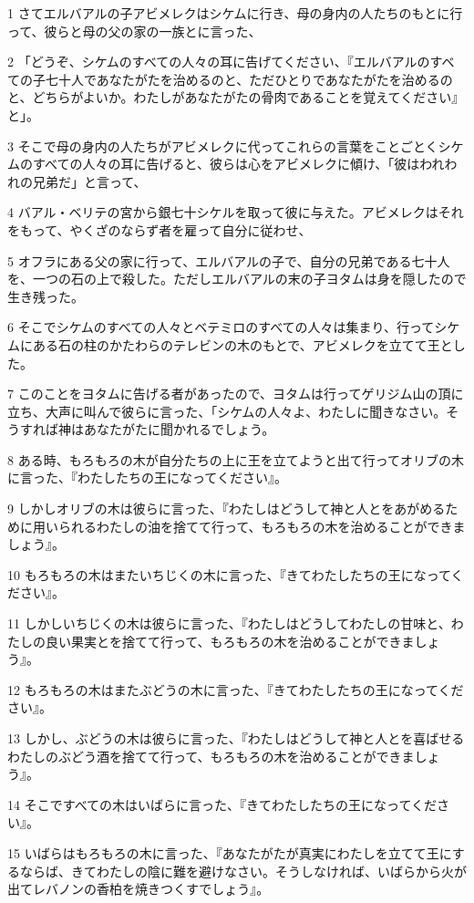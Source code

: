 \par 1 さてエルバアルの子アビメレクはシケムに行き、母の身内の人たちのもとに行って、彼らと母の父の家の一族とに言った、
\par 2 「どうぞ、シケムのすべての人々の耳に告げてください、『エルバアルのすべての子七十人であなたがたを治めるのと、ただひとりであなたがたを治めるのと、どちらがよいか。わたしがあなたがたの骨肉であることを覚えてください』と」。
\par 3 そこで母の身内の人たちがアビメレクに代ってこれらの言葉をことごとくシケムのすべての人々の耳に告げると、彼らは心をアビメレクに傾け、「彼はわれわれの兄弟だ」と言って、
\par 4 バアル・ベリテの宮から銀七十シケルを取って彼に与えた。アビメレクはそれをもって、やくざのならず者を雇って自分に従わせ、
\par 5 オフラにある父の家に行って、エルバアルの子で、自分の兄弟である七十人を、一つの石の上で殺した。ただしエルバアルの末の子ヨタムは身を隠したので生き残った。
\par 6 そこでシケムのすべての人々とベテミロのすべての人々は集まり、行ってシケムにある石の柱のかたわらのテレビンの木のもとで、アビメレクを立てて王とした。
\par 7 このことをヨタムに告げる者があったので、ヨタムは行ってゲリジム山の頂に立ち、大声に叫んで彼らに言った、「シケムの人々よ、わたしに聞きなさい。そうすれば神はあなたがたに聞かれるでしょう。
\par 8 ある時、もろもろの木が自分たちの上に王を立てようと出て行ってオリブの木に言った、『わたしたちの王になってください』。
\par 9 しかしオリブの木は彼らに言った、『わたしはどうして神と人とをあがめるために用いられるわたしの油を捨てて行って、もろもろの木を治めることができましょう』。
\par 10 もろもろの木はまたいちじくの木に言った、『きてわたしたちの王になってください』。
\par 11 しかしいちじくの木は彼らに言った、『わたしはどうしてわたしの甘味と、わたしの良い果実とを捨てて行って、もろもろの木を治めることができましょう』。
\par 12 もろもろの木はまたぶどうの木に言った、『きてわたしたちの王になってください』。
\par 13 しかし、ぶどうの木は彼らに言った、『わたしはどうして神と人とを喜ばせるわたしのぶどう酒を捨てて行って、もろもろの木を治めることができましょう』。
\par 14 そこですべての木はいばらに言った、『きてわたしたちの王になってください』。
\par 15 いばらはもろもろの木に言った、『あなたがたが真実にわたしを立てて王にするならば、きてわたしの陰に難を避けなさい。そうしなければ、いばらから火が出てレバノンの香柏を焼きつくすでしょう』。
